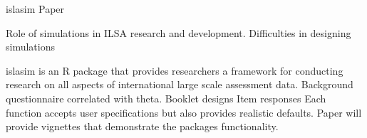 islasim Paper

Role of simulations in ILSA research and development.
Difficulties in designing simulations

islasim is an R package that provides researchers a framework for conducting research on all aspects of international large scale assessment data.  
Background questionnaire correlated with theta.
Booklet designs
Item responses
Each function accepts user specifications but also provides realistic defaults. 
Paper will provide vignettes that demonstrate the packages functionality. 